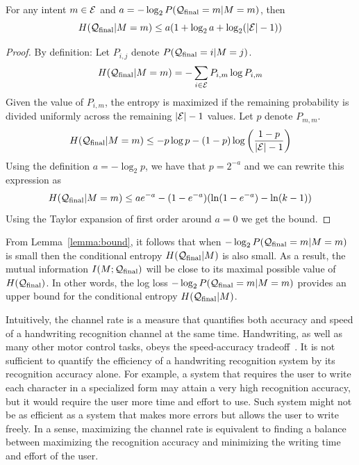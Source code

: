 \documentclass{sigchi}
\begin{document}
\begin{lemma}
\label{lemma:bound}
For any intent $m \in \mathcal{E}$ and $a =-\log_2 P(\mathcal{Q}_{\mathrm{final}} = m | M = m)$, then 
\[H(\mathcal{Q}_{\mathrm{final}} | M=m) \leq a(1+\log_2 a + \log_2 (|\mathcal{E}|-1))\]
\end{lemma}
\begin{proof}
By definition:
Let $P_{i,j}$ denote $P(\mathcal{Q}_{\mathrm{final}} = i | M = j)$.
\[ H(\mathcal{Q}_{\mathrm{final}} | M=m) = -\displaystyle\sum_{i \in \mathcal{E}} P_{i,m} \log P_{i,m}\]
Given the value of $P_{i,m}$, the entropy is maximized if the
remaining probability is divided uniformly across the remaining $|\mathcal{E}|-1$
values. Let $p$ denote $P_{m,m}$.
\[
 H(\mathcal{Q}_{\mathrm{final}} | M=m) \leq -p \log p - (1-p) \log \left(\frac{1-p}{|\mathcal{E}|-1}\right)
\]
Using the definition $a = -\log_2 p$, we have that $p=2^{-a}$ and 
we can rewrite this expression as 
\[
 H(\mathcal{Q}_{\mathrm{final}} | M=m) \leq a e^{-a} -(1-e^{-a})(\ln(1-e^{-a})-\ln(k-1))
\]
Using the Taylor expansion of first order around $a=0$ we get the bound.
\end{proof}

From Lemma~\ref{lemma:bound}, it follows that when $-\log_2
P(\mathcal{Q}_{\mathrm{final}} = m | M = m)$ is small then the conditional entropy
$H(\mathcal{Q}_{\mathrm{final}} | M)$ is also small. As a result, the mutual
information $I( M ; \mathcal{Q}_{\mathrm{final}})$ will be close to its maximal
possible value of $H(\mathcal{Q}_{\mathrm{final}})$. In other words, the log loss
$-\log_2 P(\mathcal{Q}_{\mathrm{final}} = m | M = m)$ provides an upper bound for
the conditional entropy $H(\mathcal{Q}_{\mathrm{final}} | M)$.

Intuitively, the channel rate is a measure that quantifies both
accuracy and speed of a handwriting recognition channel at the same
time. Handwriting, as well as many other motor control tasks, obeys
the speed-accuracy tradeoff~\cite{Fitts1954}. It is not sufficient to
quantify the efficiency of a handwriting recognition system by its
recognition accuracy alone. For example, a system that requires the
user to write each character in a specialized form may attain a very
high recognition accuracy, but it would require the user more time and
effort to use. Such system might not be as efficient as a system that
makes more errors but allows the user to write freely. In a sense,
maximizing the channel rate is equivalent to finding a balance between
maximizing the recognition accuracy and minimizing the writing time
and effort of the user.
\end{document}

